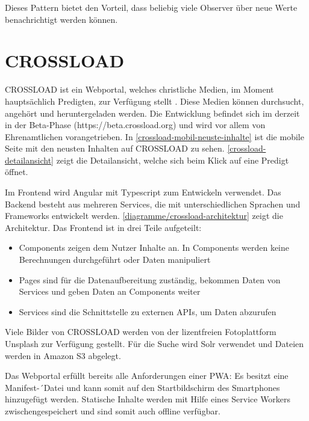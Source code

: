 Dieses Pattern bietet den Vorteil, dass beliebig viele Observer über neue Werte benachrichtigt werden können. 

\section{CROSSLOAD}
CROSSLOAD ist ein Webportal, welches christliche Medien, im Moment hauptsächlich Predigten, zur Verfügung stellt \autocite{crossload-org}. Diese Medien können durchsucht, angehört und heruntergeladen werden. Die Entwicklung befindet sich im derzeit in der Beta-Phase (https://beta.crossload.org) und wird vor allem von Ehrenamtlichen vorangetrieben. In \autoref{crossload-mobil-neuste-inhalte} ist die mobile Seite mit den neusten Inhalten auf CROSSLOAD zu sehen. \autoref{crossload-detailansicht} zeigt die Detailansicht, welche sich beim Klick auf eine Predigt öffnet.

Im Frontend wird Angular mit Typescript zum Entwickeln verwendet. Das Backend besteht aus mehreren Services, die mit unterschiedlichen Sprachen und Frameworks entwickelt werden. \autoref{diagramme/crossload-architektur} zeigt die Architektur. Das Frontend ist in drei Teile aufgeteilt:
\begin{itemize}
\item Components zeigen dem Nutzer Inhalte an. In Components werden keine Berechnungen durchgeführt oder Daten manipuliert
\item Pages sind für die Datenaufbereitung zuständig, bekommen Daten von Services und geben Daten an Components weiter
\item Services sind die Schnittstelle zu externen \acp{API}, um Daten abzurufen
\end{itemize}
Viele Bilder von CROSSLOAD werden von der lizentfreien Fotoplattform Unsplash zur Verfügung gestellt. Für die Suche wird Solr verwendet und Dateien werden in Amazon S3 abgelegt.


Das Webportal erfüllt bereits alle Anforderungen einer \ac{PWA}: Es besitzt eine Manifest-´Datei und kann somit auf den Startbildschirm des Smartphones hinzugefügt werden. Statische Inhalte werden mit Hilfe eines Service Workers zwischengespeichert und sind somit auch offline verfügbar. 


